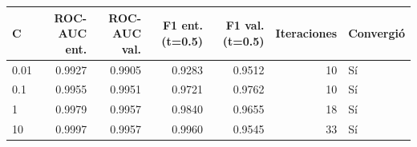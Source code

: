 \begin{tabular}{lrrrrrl}
\toprule
C & ROC-AUC ent. & ROC-AUC val. & F1 ent. (t=0.5) & F1 val. (t=0.5) & Iteraciones & Convergió \\
\midrule
0.01 & 0.9927 & 0.9905 & 0.9283 & 0.9512 & 10 & Sí \\
0.1 & 0.9955 & 0.9951 & 0.9721 & 0.9762 & 10 & Sí \\
1 & 0.9979 & 0.9957 & 0.9840 & 0.9655 & 18 & Sí \\
10 & 0.9997 & 0.9957 & 0.9960 & 0.9545 & 33 & Sí \\
\bottomrule
\end{tabular}
